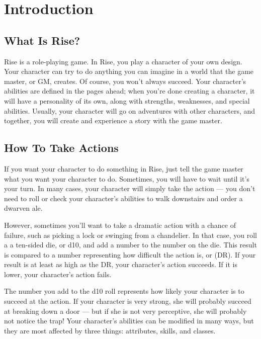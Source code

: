 \chapter{Introduction}

\section{What Is Rise?}
    Rise is a role-playing game.
    In Rise, you play a character of your own design.
    Your character can try to do anything you can imagine in a world that the game master, or GM, creates.
    Of course, you won't always succeed.
    Your character's abilities are defined in the pages ahead; when you're done creating a character, it will have a personality of its own, along with strengths, weaknesses, and special abilities.
    Usually, your character will go on adventures with other characters, and together, you will create and experience a story with the game master.

\section{How To Take Actions}

    If you want your character to do something in Rise, just tell the game master what you want your character to do.
    Sometimes, you will have to wait until it's your turn.
    In many cases, your character will simply take the action --- you don't need to roll or check your character's abilities to walk downstairs and order a dwarven ale.

    However, sometimes you'll want to take a dramatic action with a chance of failure, such as picking a lock or swinging from a chandelier.
    In that case, you roll a a ten-sided die, or d10, and add a number to the number on the die.
    This result is compared to a number representing how difficult the action is, or  (DR).
    If your result is at least as high as the DR, your character's action succeeds.
    If it is lower, your character's action fails.

    The number you add to the d10 roll represents how likely your character is to succeed at the action.
    If your character is very strong, she will probably succeed at breaking down a door --- but if she is not very perceptive, she will probably not notice the trap! Your character's abilities can be modified in many ways, but they are most affected by three things: attributes, skills, and classes.

